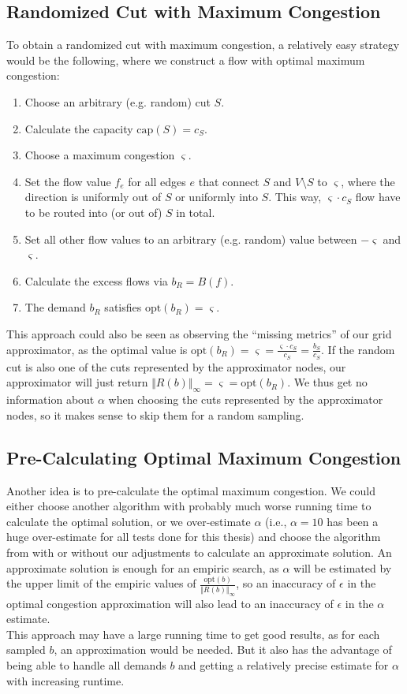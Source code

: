 \subsection{Randomized Cut with Maximum Congestion}
To obtain a randomized cut with maximum congestion, a relatively easy strategy would be the following, where we construct a flow with optimal maximum congestion:
\begin{enumerate}
\item Choose an arbitrary (e.g. random) cut $S$.
\item Calculate the capacity $\text{cap}(S)=c_S$.
\item Choose a maximum congestion $\varsigma$. 
\item Set the flow value $f_e$ for all edges $e$ that connect $S$ and $V\setminus S$ to $\varsigma$, where the direction is uniformly out of $S$ or uniformly into $S$. This way, $\varsigma\cdot c_S$ flow have to be routed into (or out of) $S$ in total.
\item Set all other flow values to an arbitrary (e.g. random) value between $-\varsigma$ and $\varsigma$.
\item Calculate the excess flows via $b_R=B(f)$.
\item The demand $b_R$ satisfies $\text{opt}(b_R)=\varsigma$.
\end{enumerate}
This approach could also be seen as observing the ``missing metrics'' of our grid approximator, as the optimal value is $\text{opt}(b_R)=\varsigma=\frac{\varsigma\cdot c_S}{c_S}=\frac{b_S}{c_S}$. If the random cut is also one of the cuts represented by the approximator nodes, our approximator will just return $\Vert R(b)\Vert_\infty =\varsigma=\text{opt}(b_R)$. We thus get no information about $\alpha$ when choosing the cuts represented by the approximator nodes, so it makes sense to skip them for a random sampling.
\subsection{Pre-Calculating Optimal Maximum Congestion}
Another idea is to pre-calculate the optimal maximum congestion. We could either choose another algorithm with probably much worse running time to calculate the optimal solution, or we over-estimate $\alpha$ (i.e., $\alpha=10$ has been a huge over-estimate for all tests done for this thesis) and choose the algorithm from \cite{nmfnlt} with or without our adjustments to calculate an approximate solution. An approximate solution is enough for an empiric search, as $\alpha$ will be estimated by the upper limit of the empiric values of $\frac{\text{opt}(b)}{\Vert R(b)\Vert_\infty}$, so an inaccuracy of $\epsilon$ in the optimal congestion approximation will also lead to an inaccuracy of $\epsilon$ in the $\alpha$ estimate.\\
This approach may have a large running time to get good results, as for each sampled $b$, an approximation would be needed. But it also has the advantage of being able to handle all demands $b$ and getting a relatively precise estimate for $\alpha$ with increasing runtime.
